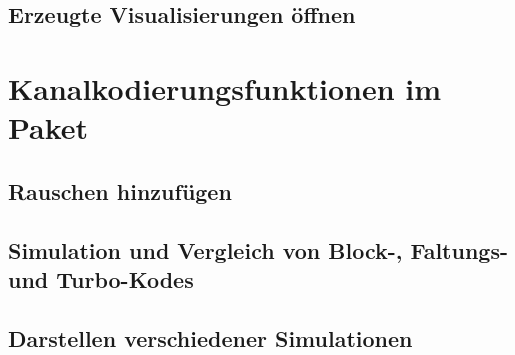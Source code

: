 \subsection{Erzeugte Visualisierungen öffnen}
\label{sec:interface_openPDF}


\section{Kanalkodierungsfunktionen im Paket}

\subsection{Rauschen hinzufügen}
\label{sec:interface_applyNoise}


\subsection{Simulation und Vergleich von Block-, Faltungs- und Turbo-Kodes}
\label{sec:interface_channelcodingSimulation}


\subsection{Darstellen verschiedener Simulationen}
\label{sec:interface_plotSimulationData}
